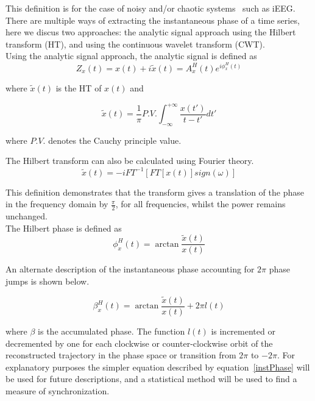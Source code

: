 \documentclass[]{article}
\begin{document}
This definition is for the case of noisy and/or chaotic
systems~\cite{Rosenblum1996} such as iEEG.\\

There are multiple ways of extracting the instantaneous phase of a
time series, here we discus two approaches: the analytic signal
approach using the Hilbert transform (HT), and using the
continuous wavelet transform (CWT).\\

Using the analytic signal approach, the analytic signal is defined
as
\begin{equation}
Z_x(t) = x(t) + i\tilde{x}(t) = A_x^H(t)e^{i\phi_x^H(t)}
\end{equation}

where $\tilde{x}(t)$ is the HT of $x(t)$ and

\begin{equation}
\tilde{x}(t) =
\frac{1}{\pi}P.V.\int_{-\infty}^{+\infty}\frac{x(t')}{t-t'}dt'
\end{equation}

where $P.V.$ denotes the Cauchy principle value.

The Hilbert transform can also be calculated using Fourier theory.
\begin{equation}
\tilde{x}(t) = -iFT^{-1}[FT[x(t)]sign(\omega)]
\end{equation}

This definition demonstrates that the transform gives a translation
of the phase in the frequency domain by $\frac{\pi}{2}$, for all
frequencies, whilst the power remains unchanged.\\

The Hilbert phase is defined as
\begin{equation}
\phi_x^{H}(t) = \arctan\frac{\tilde{x}(t)}{x(t)}
\label{instPhase}
\end{equation}

An alternate description of the instantaneous phase accounting for
$2\pi$ phase jumps is shown below.

\begin{equation}
\beta_x^{H}(t) = \arctan\frac{\tilde{x}(t)}{x(t)}+2\pi l(t)
\end{equation}

where $\beta$ is the accumulated phase. The function $l(t)$ is
incremented or decremented by one for each clockwise or
counter-clockwise orbit of the reconstructed trajectory in the phase
space or transition from $2\pi$ to $-2\pi$. For explanatory purposes
the simpler equation described by equation~\ref{instPhase} will be
used for future descriptions, and a statistical method will be used
to find
a measure of synchronization.\\
\end{document}
